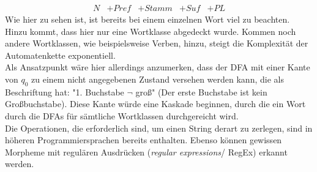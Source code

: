 \documentclass[12pt,twoside]{article}
\theoremstyle{plain}
\theoremstyle{definition}
\theoremstyle{remark}
\begin{document}
{\begin{equation*}
\begin{array}{ccccc}
	N & +Pref & +Stamm & +Suf & +PL
\end{array}
\end{equation*}
Wie hier zu sehen ist, ist bereits bei einem einzelnen Wort viel zu beachten.
Hinzu kommt, dass hier nur eine Wortklasse abgedeckt wurde.
Kommen noch andere Wortklassen, wie beispielsweise Verben, hinzu, steigt die Komplexität der Automatenkette exponentiell.\\
Als Ansatzpunkt wäre hier allerdings anzumerken, dass der DFA mit einer Kante von $q_0$ zu einem nicht angegebenen Zustand versehen werden kann, die als Beschriftung hat: "1. Buchstabe $\lnot$ groß" (Der erste Buchstabe ist kein Großbuchstabe).
Diese Kante würde eine Kaskade beginnen, durch die ein Wort durch die DFAs für sämtliche Wortklassen durchgereicht wird.\\
Die Operationen, die erforderlich sind, um einen String derart zu zerlegen, sind in höheren Programmiersprachen bereits enthalten.
Ebenso können gewissen Morpheme mit regulären Ausdrücken (\textit{regular expressions}/ RegEx) erkannt werden.
}
\end{document}
